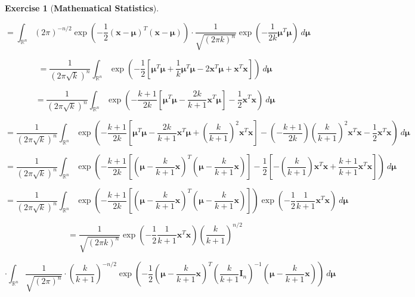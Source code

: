 \documentclass{article}
\theoremstyle{definition}
\newtheorem{exercise}{Exercise}
\theoremstyle{definition}
\theoremstyle{definition}
\theoremstyle{definition}
\theoremstyle{definition}
\begin{document}
\begin{exercise}[\textbf{Mathematical Statistics}]
\begin{enumerate}[(a)]
\[
= \int_{\mathbb{R}^n}  (2 \pi)^{-n/2} \exp \left(- \frac{1}{2}(\boldsymbol{x} - \boldsymbol{\mu}) ^T  (\boldsymbol{x} - \boldsymbol{\mu} ) \right)  \cdot \frac{1}{\sqrt{(2 \pi k)^n}} \exp \left(- \frac{1}{2k}\boldsymbol{\mu} ^T  \boldsymbol{\mu} \right) \ d \boldsymbol{\mu}
\]

\[
= \frac{1}{(2 \pi \sqrt{k})^n  } \int_{\mathbb{R}^n}  \exp \left(- \frac{1}{2}\left[  \boldsymbol{\mu} ^T\boldsymbol{\mu}  + \frac{1}{k}\boldsymbol{\mu} ^T  \boldsymbol{\mu}  - 2 \boldsymbol{x} ^T\boldsymbol{\mu}   + \boldsymbol{x}^T \boldsymbol{x}  \right]  \right)  \ d \boldsymbol{\mu}
\]

\[
= \frac{1}{(2 \pi \sqrt{k})^n  } \int_{\mathbb{R}^n}  \exp \left(-  \frac{k+1}{2k} \left[  \boldsymbol{\mu} ^T\boldsymbol{\mu}   -  \frac{2k}{k+1} \boldsymbol{x} ^T\boldsymbol{\mu}   \right] - \frac{1}{2}  \boldsymbol{x}^T \boldsymbol{x}   \right)  \ d \boldsymbol{\mu}
\]

\[
= \frac{1}{(2 \pi \sqrt{k})^n  } \int_{\mathbb{R}^n}  \exp \left(-  \frac{k+1}{2k} \left[  \boldsymbol{\mu} ^T\boldsymbol{\mu}   -  \frac{2k}{k+1} \boldsymbol{x} ^T\boldsymbol{\mu} + \left(\frac{k}{k+1} \right)^2 \boldsymbol{x}^T \boldsymbol{x}    \right] - \left(-  \frac{k+1}{2k} \right) \left(\frac{k}{k+1} \right)^2 \boldsymbol{x}^T \boldsymbol{x} - \frac{1}{2}  \boldsymbol{x}^T \boldsymbol{x}   \right)  \ d \boldsymbol{\mu}
\]

\[
= \frac{1}{(2 \pi \sqrt{k})^n  } \int_{\mathbb{R}^n}  \exp \left(-  \frac{k+1}{2k} \left[  \left( \boldsymbol{\mu} -  \frac{k}{k+1}  \boldsymbol{x} \right) ^T\left( \boldsymbol{\mu} -  \frac{k}{k+1} \boldsymbol{x} \right) \right] - \frac{1}{2} \left[ -\left(\frac{k}{k+1} \right) \boldsymbol{x}^T \boldsymbol{x}  + \frac{k+1}{k+1}  \boldsymbol{x}^T \boldsymbol{x}   \right] \right)  \ d \boldsymbol{\mu}
\]

\[
= \frac{1}{(2 \pi \sqrt{k})^n  } \int_{\mathbb{R}^n}  \exp \left(-  \frac{k+1}{2k} \left[  \left( \boldsymbol{\mu} -  \frac{k}{k+1}  \boldsymbol{x} \right) ^T\left( \boldsymbol{\mu} -  \frac{k}{k+1} \boldsymbol{x} \right) \right] \right) \exp \left(- \frac{1}{2} \frac{1}{k+1}  \boldsymbol{x}^T \boldsymbol{x}   \right)  \ d \boldsymbol{\mu}
\]

\[
= \frac{1}{\sqrt{(2 \pi k )^n}} \exp \left(- \frac{1}{2} \frac{1}{k+1} \boldsymbol{x}^T \boldsymbol{x}   \right)\left( \frac{k}{k+1} \right)^{n/2}
\]

\[
\cdot \int_{\mathbb{R}^n}  \frac{1}{\sqrt{(2 \pi)^n}}  \cdot \left( \frac{k}{k+1} \right)^{-n/2}   \exp \left(-  \frac{1}{2}   \left( \boldsymbol{\mu} -  \frac{k}{k+1}  \boldsymbol{x} \right) ^T \left( \frac{k}{k+1}\boldsymbol{I}_n \right)^{-1} \left( \boldsymbol{\mu} -  \frac{k}{k+1} \boldsymbol{x} \right)  \right)   \ d \boldsymbol{\mu}
\]


\end{enumerate}
\end{exercise}
\end{document}
